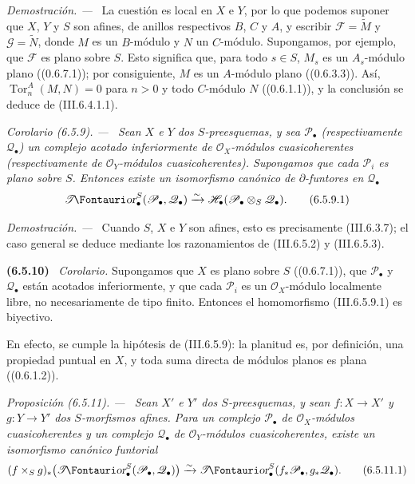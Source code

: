 \documentclass[10pt,oneside]{book}
\makeatletter
\newcommand{\sh}[1]{\mathscr{#1}}
\newcommand*{\ega@sheafop}[3]{\sh{#1}#2\textup{\kern-2.2pt{\Fontauri\slshape #3}}}
\newcommand{\shTor}{\ega@sheafop{T}{}{or}}
\newcommand{\Tor}{\operatorname{Tor}}
\newcommand{\sref}[2][]{\textup{(#2)}}
\newcommand{\oldpage}[2][]{\setcounter{footnote}{0}\marginpar{\scriptsize\textbf{#1}~|~#2}\ignorespaces}
\newenvironment{env}[1][]{\par\medskip\noindent\textbf{(#1)}\ }{\par}
\newenvironment{proposition}[1][]{\par\medskip\noindent\itshape Proposición (#1). ---\ }{\par}
\newenvironment{corollary}[1][]{\par\medskip\noindent\itshape Corolario (#1). ---\ }{\par}
\newenvironment{proof}{\par\medskip\noindent\textit{Demostración. ---\ }}{\par}
\makeatother
\begin{document}
\begin{proof}
La cuestión es local en $X$ e $Y$, por lo que podemos suponer que
$X$, $Y$ y $S$ son afines, de anillos respectivos $B$, $C$ y
$A$, y escribir $\sh F=\widetilde M$ y $\sh G=\widetilde N$,
donde $M$ es un $B$-módulo y $N$ un $C$-módulo. Supongamos, por
ejemplo, que $\sh F$ es plano sobre $S$. Esto significa que, para
todo $s\in S$, $M_s$ es un $A_s$-módulo plano
(\sref[0]{0.6.7.1}); por consiguiente, $M$ es un $A$-módulo plano
(\sref[0]{0.6.3.3}). Así,
$\Tor_n^A(M,N)=0$ para $n>0$ y todo $C$-módulo $N$
(\sref[0]{0.6.1.1}), y la conclusión se deduce de
\sref{III.6.4.1.1}.
\end{proof}

\begin{corollary}[6.5.9]
\label{III.6.5.9}
Sean $X$ e $Y$ dos $S$-preesquemas, y sea $\sh P_\bullet$
\textup{(respectivamente} $\sh Q_\bullet$\textup{)} un complejo
\oldpage[III]{151}
acotado
inferiormente de $\sh O_X$-módulos cuasicoherentes
\textup{(respectivamente} de $\sh O_Y$-módulos cuasicoherentes\textup{)}.
Supongamos que cada $\sh P_i$ es plano sobre $S$. Entonces existe
un isomorfismo canónico de $\partial$-funtores en $\sh Q_\bullet$
\[
  \boldsymbol{\shTor}_\bullet^S(\sh P_\bullet,\sh Q_\bullet)
  \xrightarrow{\sim}
  \sh H_\bullet(\sh P_\bullet\otimes_S\sh Q_\bullet).
  \tag{6.5.9.1}\label{III.6.5.9.1}
\]
\end{corollary}

\begin{proof}
Cuando $S$, $X$ e $Y$ son afines, esto es precisamente
\sref{III.6.3.7}; el caso general se deduce mediante los
razonamientos de \sref{III.6.5.2} y \sref{III.6.5.3}.
\end{proof}

\begin{env}[6.5.10]
\label{III.6.5.10}
\emph{Corolario.}
Supongamos que $X$ es plano sobre $S$ (\sref[0]{0.6.7.1}), que
$\sh P_\bullet$ y $\sh Q_\bullet$ están acotados inferiormente,
y que cada $\sh P_i$ es un $\sh O_X$-módulo localmente libre, no
necesariamente de tipo finito. Entonces el homomorfismo
\sref{III.6.5.9.1} es biyectivo.

En efecto, se cumple la hipótesis de \sref{III.6.5.9}: la
planitud es, por definición, una propiedad puntual en $X$, y toda
suma directa de módulos planos es plana (\sref[0]{0.6.1.2}).
\end{env}

\begin{proposition}[6.5.11]
\label{III.6.5.11}
Sean $X'$ e $Y'$ dos $S$-preesquemas, y sean
$f:X\to X'$ y $g:Y\to Y'$ dos $S$-morfismos afines. Para un
complejo $\sh P_\bullet$ de $\sh O_X$-módulos cuasicoherentes y
un complejo $\sh Q_\bullet$ de $\sh O_Y$-módulos
cuasicoherentes, existe un isomorfismo canónico funtorial
\[
  (f\times_Sg)_*
  \bigl(\boldsymbol{\shTor}_\bullet^S(\sh P_\bullet,\sh Q_\bullet)\bigr)
  \xrightarrow{\sim}
  \boldsymbol{\shTor}_\bullet^S(f_*\sh P_\bullet,g_*\sh Q_\bullet).
  \tag{6.5.11.1}\label{III.6.5.11.1}
\]
\end{proposition}
\end{document}
